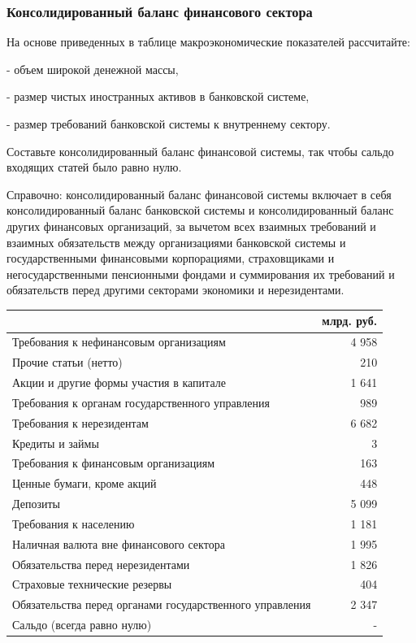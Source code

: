 \documentclass[12pt, table, a4paper,twoside]{exam}
\begin{document}
\begin{questions}
\begin{solution}[12em]
\end{solution}

\subsubsection{Консолидированный баланс финансового сектора}
\question[10] На основе приведенных в таблице макроэкономические показателей рассчитайте:

- объем широкой денежной массы,

- размер чистых иностранных активов в банковской системе, 

- размер требований банковской системы к внутреннему сектору. 

Составьте консолидированный баланс финансовой системы, так чтобы сальдо входящих статей было равно нулю. 

Справочно: консолидированный баланс финансовой системы включает в себя консолидированный баланс банковской системы и консолидированный баланс других финансовых организаций, за вычетом всех взаимных требований и взаимных обязательств между организациями банковской системы и государственными финансовыми корпорациями, страховщиками и негосударственными пенсионными фондами и суммирования их требований и обязательств перед другими секторами экономики и нерезидентами.


\begin{tabularx}{\linewidth}[b]{@{}>{\raggedright\arraybackslash}Xr@{}}				& млрд. руб.\\
	\toprule
	Требования к нефинансовым организациям & 4 958 \\
	Прочие статьи (нетто) & 210 \\
	Акции и другие формы участия в капитале & 1 641 \\
	Требования к органам государственного управления & 989 \\
	Требования к нерезидентам & 6 682 \\
	Кредиты и займы & 3 \\
	Требования к финансовым организациям & 163 \\
	Ценные бумаги, кроме акций & 448 \\
	Депозиты & 5 099 \\
	Требования к населению & 1 181 \\
	Наличная валюта вне финансового сектора & 1 995 \\
	Обязательства перед нерезидентами & 1 826 \\
	Страховые технические резервы & 404 \\
	Обязательства перед органами государственного управления & 2 347 \\
	Сальдо (всегда равно нулю) &                   -      \\
	\bottomrule
\end{tabularx}%


\end{questions}
\end{document}

